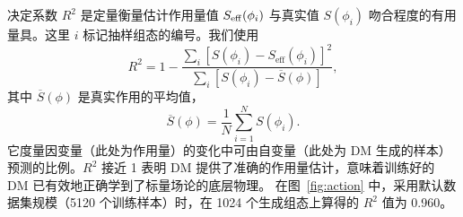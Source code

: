 决定系数 $R^2$ 是定量衡量估计作用量值 $S_{\rm eff}(\phi_i)$ 与真实值 $S(\phi_i)$ 吻合程度的有用量具。这里 $i$ 标记抽样组态的编号。我们使用
\begin{equation}
  R^2 = 1 - \frac{\sum_i\left[ S(\phi_i) - S_\text{eff}(\phi_i)\right]^2}{\sum_i \left[S(\phi_i) - \overline{S}(\phi)\right]},
\end{equation}
其中 $\overline{S}(\phi)$ 是真实作用的平均值，
\begin{equation}
    \overline{S}(\phi) =\frac{1}{N}\sum_{i=1}^N S(\phi_i).
\end{equation}
它度量因变量（此处为作用量）的变化中可由自变量（此处为 DM 生成的样本）预测的比例。$R^2$ 接近 1 表明 DM 提供了准确的作用量估计，意味着训练好的 DM 已有效地正确学到了标量场论的底层物理。
在图~\ref{fig:action} 中，采用默认数据集规模（5120 个训练样本）时，在 1024 个生成组态上算得的 $R^2$ 值为 0.960。

